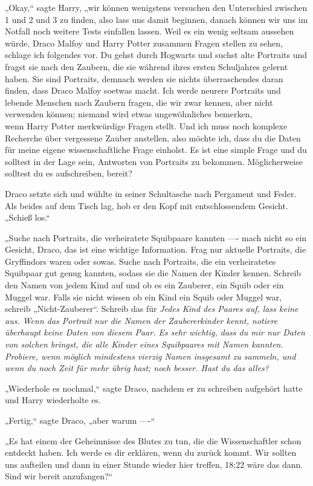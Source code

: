 {„Okay,“ sagte Harry, „wir können wenigstens versuchen den Unterschied zwischen 1 und 2 und 3 zu finden, also lass uns damit beginnen, danach können wir uns im Notfall noch weitere Tests einfallen lassen. Weil es ein wenig seltsam aussehen würde, Draco Malfoy und Harry Potter zusammen Fragen stellen zu sehen, schlage ich folgendes vor. Du gehst durch Hogwarts und suchst alte Portraits und fragst sie nach den Zaubern, die sie während ihres ersten Schuljahres gelernt haben. Sie sind Portraits, demnach werden sie nichts überraschendes daran finden, dass Draco Malfoy soetwas macht. Ich werde neurere Portraits und lebende Menschen nach Zaubern fragen, die wir zwar kennen, aber nicht verwenden können; niemand wird etwas ungewöhnliches bemerken,\\ wenn Harry Potter merkwürdige Fragen stellt. Und ich muss noch komplexe Recherche über vergessene Zauber anstellen, also möchte ich, dass du die Daten für meine eigene wissenschaftliche Frage einholst. Es ist eine simple Frage und du solltest in der Lage sein, Antworten von Portraits zu bekommen. Möglicherweise solltest du es aufschreiben, bereit?

Draco setzte sich und wühlte in seiner Schultasche nach Pergament und Feder. Als beides auf dem Tisch lag, hob er den Kopf mit entschlossendem Gesicht. „Schieß los.“

„Suche nach Portraits, die verheiratete Squibpaare kannten ---- mach nicht so ein Gesicht, Draco, das ist eine wichtige Information. Frag nur aktuelle Portraits, die Gryffindors waren oder sowas. Suche nach Portraits, die ein verheiratetes Squibpaar gut genug kannten, sodass sie die Namen der Kinder kennen. Schreib den Namen von jedem Kind auf und ob es ein Zauberer, ein Squib oder ein Muggel war. Falls sie nicht wissen ob ein Kind ein Squib oder Muggel war, schreib „Nicht-Zauberer“. Schreib das für \emph{Jedes Kind des Paares auf, lass keine aus. Wenn das Portrait nur die Namen der Zaubererkinder kennt, notiere überhaupt keine Daten von diesem Paar. Es sehr wichtig, dass du mir nur Daten von solchen bringst, die \emph{alle} Kinder eines Squibpaares mit Namen kannten. Probiere, wenn möglich mindestens vierzig Namen insgesamt zu sammeln, und wenn du noch Zeit für mehr übrig hast; noch besser. Hast du das alles?}

„Wiederhole es nochmal,“ sagte Draco, nachdem er zu schreiben aufgehört hatte und Harry wiederholte es.

„Fertig,“ sagte Draco, „aber warum ----“

„Es hat einem der Geheimnisse des Blutes zu tun, die die Wissenschaftler schon entdeckt haben. Ich werde es dir erklären, wenn du zurück kommt. Wir sollten uns aufteilen und dann in einer Stunde wieder hier treffen, 18:22 wäre das dann. Sind wir bereit anzufangen?“

}
